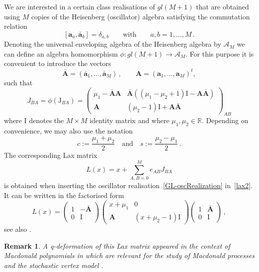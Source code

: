 \documentclass[11pt]{article}
\numberwithin{equation}{section}
\newtheorem{remark}[theorem]{Remark}
\newcommand{\oa}{\mathbf{a}}
\newcommand{\oad}{\mathbf{\bar{a}}}
\newcommand{\OA}{\mathbf{A}}
\newcommand{\OAD}{\mathbf{\bar{A}}}
\newcommand{\mmu}{\mu}
\newcommand{\M}{M}
\newcommand{\ID}{\mathrm{I}}
\begin{document}
We are interested in a certain class realisations of $gl(\M+1)$ that are obtained using $\M$ copies of the Heisenberg (oscillator) algebra satisfying the commutation relation
  \begin{equation}\label{eq:osc}
   [\oa_{ a},\oad_{ b}]=\delta_{a,b}\qquad \text{with}\qquad a, b=1,\ldots,\M\,.
  \end{equation}
  Denoting the universal enveloping  algebra of the Heisenberg algebra by $\mathcal{A}_M$ we can define an algebra homomorphism $\phi:gl(M+1)\to \mathcal{A}_M$. For this purpose it is convenient to introduce the vectors
\begin{equation}
		\OAD=(\oad_{1},\ldots,\oad_{\M})\,,\qquad \OA=(\oa_1,\ldots,\oa_{\M})^t,
	\end{equation}
	such that
	\begin{equation}\label{GL-oscRealization}
		J_{BA}=\phi(\mathrm{J}_{BA})=\left(\begin{array}{cc}
			\mmu_1-\OAD\OA&\OAD\left((\mmu_1-\mmu_2+1)\ID-\OA\OAD\right)\\
			\OA&(\mmu_2-1)\ID+\OA\OAD
		\end{array}\right) _{AB}
	\end{equation}
	where $\ID$ denotes the $\M\times\M$ identity matrix and where $\mu_{1},\mu_{2}\in \mathbb{R}$. Depending on convenience, we may also use the notation
    \begin{equation}\label{CandS}
        c:=\frac{\mu_{1}+\mu_{2}}{2}\quad \text{and}\quad s:=\frac{\mu_{2}-\mu_{1}}{2}\,.
    \end{equation}
The corresponding Lax matrix
\begin{equation}\label{lax2}
    L(x)=x+\sum_{A,B=0}^{\M} e_{AB}J_{BA}
    \end{equation} 
is obtained when inserting the oscillator realisation~\eqref{GL-oscRealization} in~\eqref{lax2}. It can be written in the factorised form
	\begin{equation}\label{eq:laxfac}
		L(x)=\left(\begin{array}{cc}
			1&-\OAD\\
			0&\ID
		\end{array}\right)\left(\begin{array}{cc}
			x+\mmu_1&0\\
			\OA&(x+\mmu_2-1)\ID
		\end{array}\right)\left(\begin{array}{cc}
			1&\OAD\\
			0&\ID
		\end{array}\right)\,,
	\end{equation}
	see also \cite{Derkachov:2006fw}.
\begin{remark}
A q-deformation of this Lax matrix appeared in the context of Macdonald polynomials in
\cite{2017CMaPh.352..773G} which are relevant for the study of Macdonald processes \cite{2011arXiv1111.4408B}  and   the stochastic vertex model \cite{2016arXiv160105770B}.
\end{remark}
\end{document}
